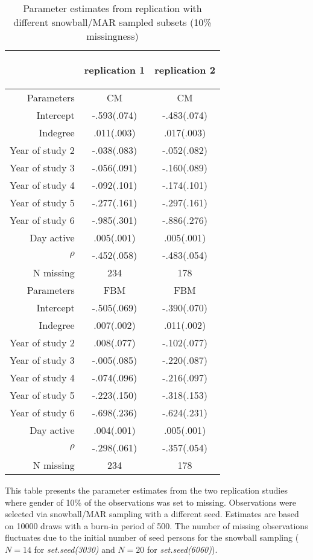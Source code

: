 \documentclass{article}
\begin{document}
\begin{table}[ht]
	\centering
	\caption{Parameter estimates from replication with different snowball/MAR sampled subsets (10\% missingness)}
	\label{tab:replication_snowball}
        \bigskip
		\bigskip
		\bigskip
		\begin{tabular}{r|cc}
			&
			\begin{rotate}{60} replication 1 \end{rotate} &
			\begin{rotate}{60} replication 2 \end{rotate} \\ \hline
			Parameters	   & CM      	& CM        \\ \hline
			Intercept 	   &-.593(.074)	&-.483(.074) \\
			Indegree	   & .011(.003)	& .017(.003) \\
			Year of study 2&-.038(.083)	&-.052(.082) \\
			Year of study 3&-.056(.091)	&-.160(.089) \\
			Year of study 4&-.092(.101)	&-.174(.101) \\
			Year of study 5&-.277(.161)	&-.297(.161) \\
			Year of study 6&-.985(.301)	&-.886(.276) \\
			Day active 	   & .005(.001)	& .005(.001) \\
			$\rho$ 		   &-.452(.058)	&-.483(.054) \\
			N missing      & 234        & 178        \\ \hline
			
			Parameters	   & FBM     	& FBM    	 \\ \hline
			Intercept 	   &-.505(.069) &-.390(.070) \\
			Indegree       & .007(.002) & .011(.002) \\
			Year of study 2& .008(.077) &-.102(.077) \\
			Year of study 3&-.005(.085) &-.220(.087) \\
			Year of study 4&-.074(.096) &-.216(.097) \\
			Year of study 5&-.223(.150) &-.318(.153) \\
			Year of study 6&-.698(.236) &-.624(.231) \\		
			Day active 	   & .004(.001) & .005(.001) \\
			$\rho$ 		   &-.298(.061) &-.357(.054) \\
			N missing      & 234        & 178        \\ \hline
		\end{tabular}
	
	\raggedright This table presents the parameter estimates from the two replication studies where gender of 10\% of the observations was set to missing. Observations were selected via snowball/MAR sampling with a different seed. Estimates are based on 10000 draws with a burn-in period of 500. The number of missing observations fluctuates due to the initial number of seed persons for the snowball sampling ($N = 14$ for \textit{set.seed(3030)} and $N = 20$ for \textit{set.seed(6060)}).
\end{table}
\end{document}
